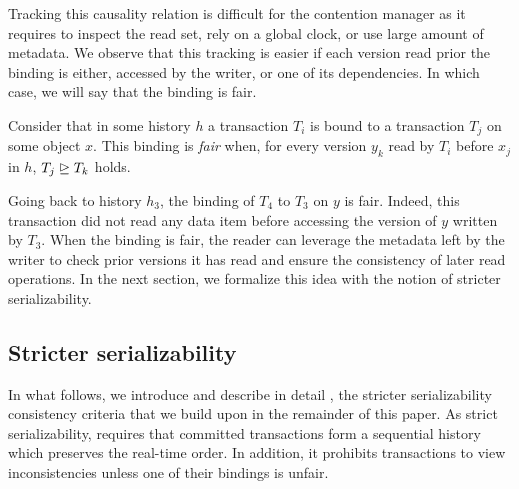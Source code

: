 Tracking this causality relation is difficult for the contention manager as it requires to inspect the read set, rely on a global clock, or use large amount of metadata.
We observe that this tracking is easier if each version read prior the binding is either, accessed by the writer, or one of its dependencies.
In which case, we will say that the binding is fair.

\begin{definition}
  Consider that in some history $h$ a transaction $T_i$ is bound to a transaction $T_j$ on some object $x$.
  This binding is \emph{fair} when, for every version $y_k$ read by $T_i$ before $x_j$ in $h$, $T_j \mathrel{\unrhd} T_k$ holds.
\end{definition}

Going back to history $h_3$, the binding of $T_4$ to $T_3$ on $y$ is fair.
Indeed, this transaction did not read any data item before accessing the version of $y$ written by $T_3$.
When the binding is fair, the reader can leverage the metadata left by the writer to check prior versions it has read and ensure the consistency of later read operations.
In the next section, we formalize this idea with the notion of stricter serializability.

\subsection{Stricter serializability}
In what follows, we introduce and describe in detail \SPSER, the stricter serializability consistency criteria that we build upon in the remainder of this paper.
As strict serializability, \SPSER requires that committed transactions form a sequential history which preserves the real-time order.
In addition, it prohibits transactions to view inconsistencies unless one of their bindings is unfair.

